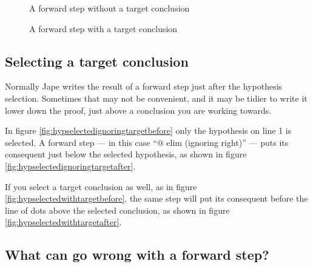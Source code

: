 \documentclass[11pt]{book}
\newcommand{\figref}[1]{figure \ref{fig:#1}}
\begin{document}
\begin{figure}
\centering
{}
\qquad
{}
\caption{A forward step without a target conclusion}
\label{fig:hypselectedignoringtarget}
\end{figure}
\begin{figure}
\centering
{}
\qquad
{}
\caption{A forward step with a target conclusion}
\label{fig:hypselectedwithtarget}
\end{figure}

\subsection{Selecting a target conclusion}

Normally Jape writes the result of a forward step just after 
the hypothesis selection. Sometimes that may not be convenient, 
and it may be tidier to write it lower down the proof, just above 
a conclusion you are working towards.

In \figref{hypselectedignoringtargetbefore} only the hypothesis on line 1 is selected. A forward step --- in this case ``$@$ elim (ignoring right)'' --- puts its consequent just below the selected hypothesis, as shown in \figref{hypselectedignoringtargetafter}.

If you select a target conclusion as well, as in \figref{hypselectedwithtargetbefore}, the same step will put its consequent before the line of dots above the selected conclusion, as shown in \figref{hypselectedwithtargetafter}.

\subsection{What can go wrong with a forward step?}
\end{document}
